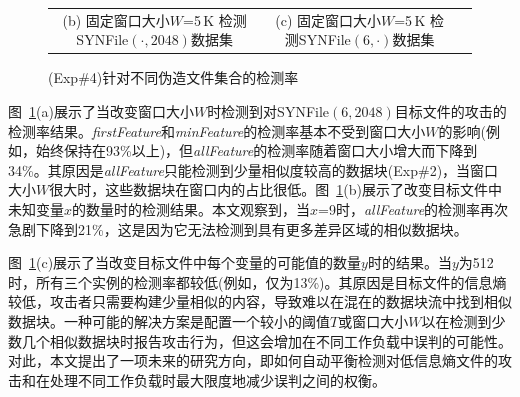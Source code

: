 \begin{figure}[!htb]
\begin{tabular}{@{\ }c@{\ }c@{\ }c}
        \makecell[c]{\small (b) 固定窗口大小$W$=5\,K                                                              \\ \small 检测SYNFile$(\cdot,2048)$数据集} &
        \makecell[c]{\small (c) 固定窗口大小$W$=5\,K                                                              \\ \small 检测SYNFile$(6,\cdot)$数据集} \\
    \end{tabular}
    \caption{(Exp\#4)针对不同伪造文件集合的检测率}
    \label{fig:featurespy-expDetectionTradeOff}
\end{figure}

图~\ref{fig:featurespy-expDetectionTradeOff}(a)展示了当改变窗口大小$W$时检测到对SYNFile$(6,2048)$目标文件的攻击的检测率结果。\textit{firstFeature}和\textit{minFeature}的检测率基本不受到窗口大小$W$的影响(例如，始终保持在93\%以上)，但\textit{allFeature}的检测率随着窗口大小增大而下降到34\%。其原因是\textit{allFeature}只能检测到少量相似度较高的数据块(Exp\#2)，当窗口大小$W$很大时，这些数据块在窗口内的占比很低。图~\ref{fig:featurespy-expDetectionTradeOff}(b)展示了改变目标文件中未知变量$x$的数量时的检测结果。本文观察到，当$x$=9时，\textit{allFeature}的检测率再次急剧下降到21\%，这是因为它无法检测到具有更多差异区域的相似数据块。

图~\ref{fig:featurespy-expDetectionTradeOff}(c)展示了当改变目标文件中每个变量的可能值的数量$y$时的结果。当$y$为512时，所有三个实例的检测率都较低(例如，仅为13\%)。其原因是目标文件的信息熵较低，攻击者只需要构建少量相似的内容，导致\sysnameF 难以在混在的数据块流中找到相似数据块。一种可能的解决方案是配置一个较小的阈值$T$或窗口大小$W$以在检测到少数几个相似数据块时报告攻击行为，但这会增加在不同工作负载中误判的可能性。对此，本文提出了一项未来的研究方向，即如何自动平衡检测对低信息熵文件的攻击和在处理不同工作负载时最大限度地减少误判之间的权衡。